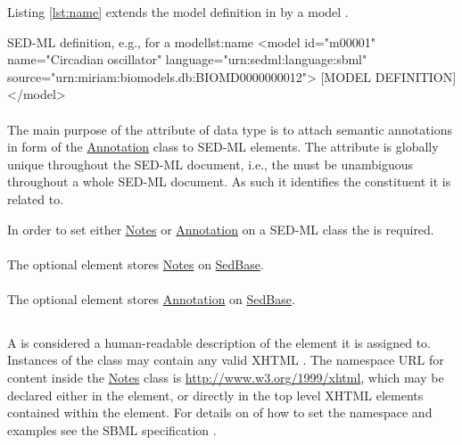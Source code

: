 \begin{blockChanged}
Listing \ref{lst:name} extends the model definition in  by a model .

\begin{myXmlLst}{SED-ML  definition, e.g., for a model}{lst:name}
<model id="m00001" name="Circadian oscillator" language="urn:sedml:language:sbml" source="urn:miriam:biomodels.db:BIOMD0000000012">
	[MODEL DEFINITION]
</model>
\end{myXmlLst}
\end{blockChanged}



\paragraph*{}
\label{sec:metaid}
The main purpose of the  attribute of data type  is to attach semantic annotations in form of the \hyperref[class:annotation]{Annotation} class to SED-ML elements. The  attribute is globally unique throughout the SED-ML document, i.e., the  must be unambiguous throughout a whole SED-ML document. As such it identifies the constituent it is related to.

In order to set either \hyperref[class:notes]{Notes} or \hyperref[class:annotation]{Annotation} on a SED-ML class the  is required.

\paragraph*{}
\label{sec:notesElement}
The optional  element stores \hyperref[class:notes]{Notes} on \hyperref[class:sedBase]{SedBase}.

\paragraph*{}
\label{sec:annotationElement}
The optional  element stores \hyperref[class:annotation]{Annotation} on \hyperref[class:sedBase]{SedBase}.

\subsection{}
\label{class:notes}
A  is considered a human-readable description of the element it is assigned to. Instances of the  class may contain any valid XHTML \citep{P+02}. The namespace URL for  content inside the \hyperref[class:notes]{Notes} class is \url{http://www.w3.org/1999/xhtml}, which may be declared either in the \hyperref[class:sed-ml]{} element, or directly in the top level XHTML elements contained within the \hyperref[sec:notesElement]{} element. For details on of how to set the namespace and examples see the SBML specification \citep{HBH+10}.

